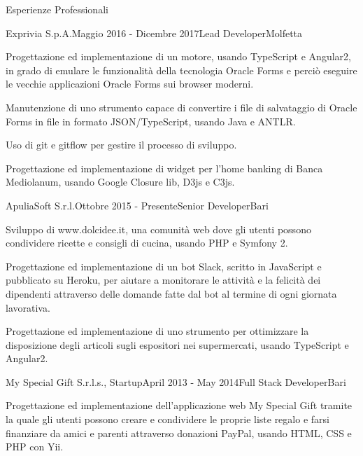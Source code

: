 \documentclass{resume} %
\begin{document}
\begin{rSection}{Esperienze Professionali}

\begin{rSubsection}{Exprivia S.p.A.}{Maggio 2016 - Dicembre 2017}{Lead Developer}{Molfetta}
\item Progettazione ed implementazione di un motore, usando TypeScript e Angular2,
in grado di emulare le funzionalit\`a della tecnologia Oracle Forms e perci\`o eseguire le vecchie applicazioni Oracle Forms sui browser moderni.
\item Manutenzione di uno strumento capace di convertire i file di salvataggio di Oracle Forms in file in formato JSON/TypeScript, usando Java e ANTLR.
\item Uso di git e gitflow per gestire il processo di sviluppo.
\item Progettazione ed implementazione di widget per l'home banking di Banca Mediolanum, usando Google Closure lib, D3js e C3js.
\end{rSubsection}


\begin{rSubsection}{ApuliaSoft S.r.l.}{Ottobre 2015 - Presente}{Senior Developer}{Bari}
\item Sviluppo di www.dolcidee.it, una comunit\`a web dove gli utenti possono condividere ricette e consigli di cucina, usando PHP e Symfony 2.
\item Progettazione ed implementazione di un bot Slack, scritto in JavaScript e pubblicato su Heroku, per aiutare a monitorare le attivit\`a e
la felicit\`a dei dipendenti attraverso delle domande fatte dal bot al termine di ogni giornata lavorativa.
\item Progettazione ed implementazione di uno strumento per ottimizzare la disposizione degli articoli sugli espositori nei supermercati, usando TypeScript e Angular2.
\end{rSubsection}


\begin{rSubsection}{My Special Gift S.r.l.s., Startup}{April 2013 - May 2014}{Full Stack Developer}{Bari}
\item Progettazione ed implementazione dell'applicazione web My Special Gift tramite la quale gli utenti possono creare e condividere le proprie liste regalo e farsi finanziare da amici e parenti attraverso donazioni PayPal, usando HTML, CSS e PHP con Yii.
\end{rSubsection}


\end{rSection}
\end{document}
